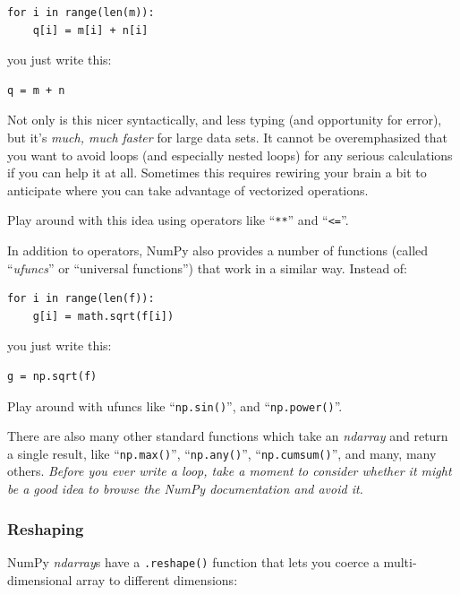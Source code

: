 \begin{Verbatim}[fontsize=\small,samepage=true,frame=single]
for i in range(len(m)):
    q[i] = m[i] + n[i]
\end{Verbatim}

you just write this:

\begin{Verbatim}[fontsize=\small,samepage=true,frame=single]
q = m + n
\end{Verbatim}

Not only is this nicer syntactically, and less typing (and opportunity for
error), but it's \textit{much, much faster} for large data sets. It cannot be
overemphasized that you want to avoid loops (and especially nested loops) for
any serious calculations if you can help it at all. Sometimes this requires
rewiring your brain a bit to anticipate where you can take advantage of
vectorized operations.

Play around with this idea using operators like ``\texttt{**}'' and
``\texttt{<=}''.

In addition to operators, NumPy also provides a number of functions (called
``\textit{ufuncs}'' or ``universal functions'') that work in a similar way.
Instead of:

\begin{Verbatim}[fontsize=\small,samepage=true,frame=single]
for i in range(len(f)):
    g[i] = math.sqrt(f[i])
\end{Verbatim}

you just write this:

\begin{Verbatim}[fontsize=\small,samepage=true,frame=single]
g = np.sqrt(f)
\end{Verbatim}

Play around with ufuncs like ``\texttt{np.sin()}'', and
``\texttt{np.power()}''.

There are also many other standard functions which take an \textit{ndarray}
and return a single result, like ``\texttt{np.max()}'', ``\texttt{np.any()}'',
``\texttt{np.cumsum()}'', and many, many others. \textit{Before you ever write
a loop, take a moment to consider whether it might be a good idea to browse
the NumPy documentation and avoid it.}

\subsubsection{Reshaping}

NumPy \textit{ndarray}s have a \texttt{.reshape()} function that lets you
coerce a multi-dimensional array to different dimensions:

